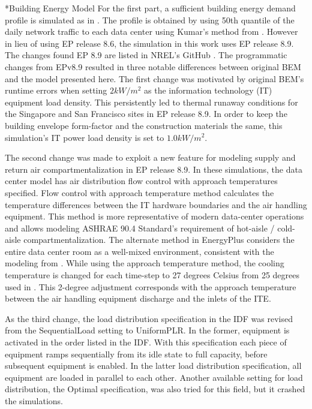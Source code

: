 \documentclass[twocolumn, a4paper,10pt]{article}
\makeatletter
\renewcommand\subsection{\@startsection{subsection}{1}{\z@}{\z@}{\z@}{\normalfont\normalsize\bfseries}}
\renewcommand\subsection{\@startsection{subsection}{1}{\z@}{\z@}{0.1pt}{\normalfont\normalsize\bfseries}}
\makeatother
\begin{document}
\subsection*{Building Energy Model }
For the first part, a sufficient building energy demand profile is simulated as in \citep{kumar20}.  The profile is obtained by using 50th quantile of the daily network traffic to each data center using Kumar’s method from \citep{kumar20b}.  However in lieu of using EP release 8.6, the simulation in this work uses EP release 8.9. The changes found EP 8.9 are listed in NREL’s GitHub \citep{nrel_git}. The programmatic changes from EPv8.9 resulted in three notable differences between original BEM and the model presented here.  The first change was motivated by original BEM's runtime errors when setting $2kW/m^2$ as the information technology (IT) equipment load density. This persistently led to thermal runaway conditions for the Singapore and San Francisco sites in EP release 8.9. In order to keep the building envelope form-factor and the construction materials the same, this simulation’s IT power load density is set to $1.0kW/m^2$.

The second change was made to exploit a new feature for modeling supply and return air compartmentalization in EP release 8.9. In these simulations, the data center model has air distribution flow control with approach temperatures specified. Flow control with approach temperature method calculates the temperature differences between the IT hardware boundaries and the air handling equipment.  This method is more representative of modern data-center operations and allows modeling ASHRAE 90.4 Standard’s requirement of hot-aisle / cold-aisle compartmentalization. The alternate method in EnergyPlus considers the entire data center room as a well-mixed environment, consistent with the modeling from \citep{kumar20}. While using the approach temperature method, the cooling temperature is changed for each time-step to 27 degrees Celsius from 25 degrees used in \citep{kumar20}. This 2-degree adjustment corresponds with the approach temperature between the air handling equipment discharge and the inlets of the ITE. 

As the third change, the load distribution specification in the IDF was revised from the SequentialLoad setting to UniformPLR. In the former, equipment is activated in the order listed in the IDF. With this specification each piece of equipment ramps sequentially from its idle state to full capacity, before subsequent equipment is enabled. In the latter load distribution specification, all equipment are loaded in parallel to each other. Another available setting for load distribution, the Optimal specification, was also tried for this field, but it crashed the simulations.
\end{document}
